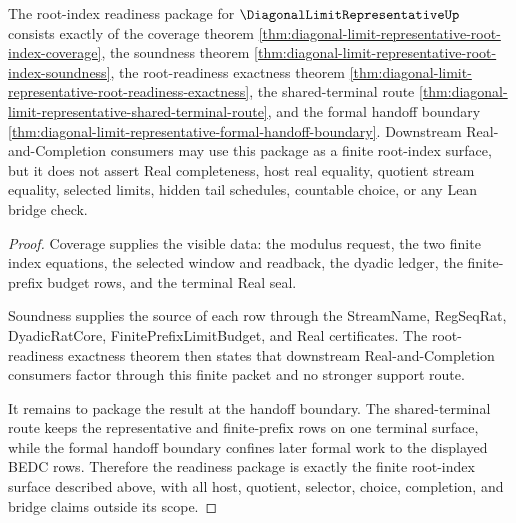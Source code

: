 \begin{theorem}
\label{thm:diagonal-limit-representative-root-index-readiness-package}
The root-index readiness package for $\DiagonalLimitRepresentativeUp$ consists exactly of the coverage theorem \autoref{thm:diagonal-limit-representative-root-index-coverage}, the soundness theorem \autoref{thm:diagonal-limit-representative-root-index-soundness}, the root-readiness exactness theorem \autoref{thm:diagonal-limit-representative-root-readiness-exactness}, the shared-terminal route \autoref{thm:diagonal-limit-representative-shared-terminal-route}, and the formal handoff boundary \autoref{thm:diagonal-limit-representative-formal-handoff-boundary}. Downstream Real-and-Completion consumers may use this package as a finite root-index surface, but it does not assert Real completeness, host real equality, quotient stream equality, selected limits, hidden tail schedules, countable choice, or any Lean bridge check.
\end{theorem}
\begin{proof}
Coverage supplies the visible data: the modulus request, the two finite index equations, the selected window and readback, the dyadic ledger, the finite-prefix budget rows, and the terminal Real seal.

Soundness supplies the source of each row through the StreamName, RegSeqRat, DyadicRatCore, FinitePrefixLimitBudget, and Real certificates. The root-readiness exactness theorem then states that downstream Real-and-Completion consumers factor through this finite packet and no stronger support route.

It remains to package the result at the handoff boundary. The shared-terminal route keeps the representative and finite-prefix rows on one terminal surface, while the formal handoff boundary confines later formal work to the displayed BEDC rows. Therefore the readiness package is exactly the finite root-index surface described above, with all host, quotient, selector, choice, completion, and bridge claims outside its scope.
\end{proof}
